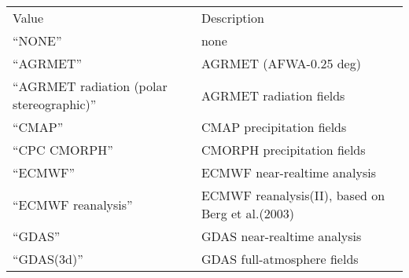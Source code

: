  \begin{tabular}{ll}
 Value                 & Description                                \\
 ``NONE''              & none                                       \\
 
 ``AGRMET''            & AGRMET (AFWA-0.25 deg)                     \\
 ``AGRMET radiation (polar stereographic)'' & AGRMET radiation fields \\
 
 ``CMAP''              & CMAP precipitation fields                  \\
 ``CPC CMORPH''        & CMORPH precipitation fields                \\
 ``ECMWF''             & ECMWF near-realtime analysis               \\
 ``ECMWF reanalysis''  & ECMWF reanalysis(II),
                         based on Berg et al.(2003)                 \\
 ``GDAS''              & GDAS near-realtime analysis                \\
 
 ``GDAS(3d)''          & GDAS full-atmosphere fields                \\
 

\end{tabular}
